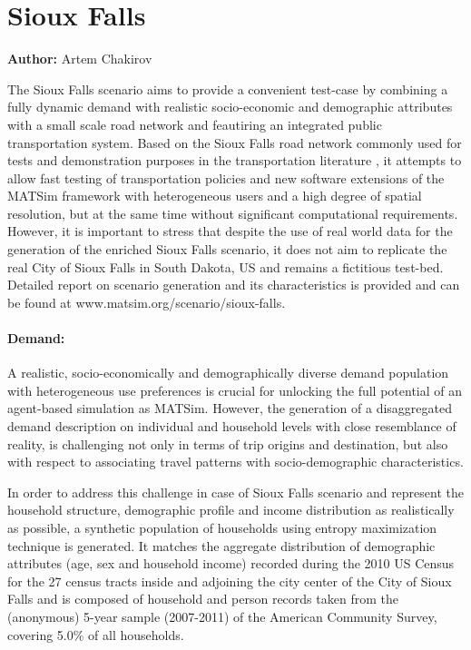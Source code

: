 \section{Sioux Falls}
\label{ch:scenarios:siouxfalls}
\hfill \textbf{Author:} Artem Chakirov

The Sioux Falls scenario aims to provide a convenient test-case by combining a fully dynamic demand with realistic socio-economic and demographic attributes with a small scale road network and feautiring an integrated public transportation system. Based on the Sioux Falls road network commonly used for tests and demonstration purposes in the transportation literature \citep[][]{BarGera_TNTP_Webpage_2013}, it attempts to allow fast testing  of transportation policies and new software extensions of the MATSim framework with heterogeneous users and a high degree of spatial resolution, but at the same time without significant computational requirements. However, it is important to stress that despite the use of real world data for the generation of the enriched Sioux Falls scenario, it does not aim to replicate the real City of Sioux Falls in South Dakota, US and remains a fictitious test-bed. Detailed report on scenario generation and its characteristics is provided \citet[][]{ChakirovFourie_TechRep_FCL_2014} and can be found at www.matsim.org/scenario/sioux-falls. 

\paragraph{Demand:}

A realistic, socio-economically and demographically diverse demand population with  heterogeneous use preferences is crucial for unlocking the full potential of an agent-based simulation as MATSim. However, the generation of a disaggregated demand description on individual and household levels with close resemblance of reality, is challenging not only in terms of trip origins and destination, but also with respect to associating travel patterns with socio-demographic characteristics.

In order to address this challenge in case of Sioux Falls scenario and represent the household structure, demographic profile and income distribution as realistically as possible, a synthetic population of households using entropy maximization technique is generated. It matches the aggregate distribution of demographic attributes (age, sex and household income) recorded during the 2010 US Census for the 27 census tracts inside and adjoining the city center of the City of Sioux Falls and is composed of household and person records taken from the (anonymous) 5-year sample (2007-2011) of the American Community Survey, covering 5.0\% of all households.

